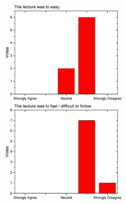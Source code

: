 \begin{figure}[h!]
\begin{minipage}{.48\linewidth}
      {\includegraphics[height=50mm]{figures/n/Graph25.pdf}}
      {\includegraphics[height=50mm]{figures/n/Graph26.pdf}}
  \end{minipage}
\end{figure}

